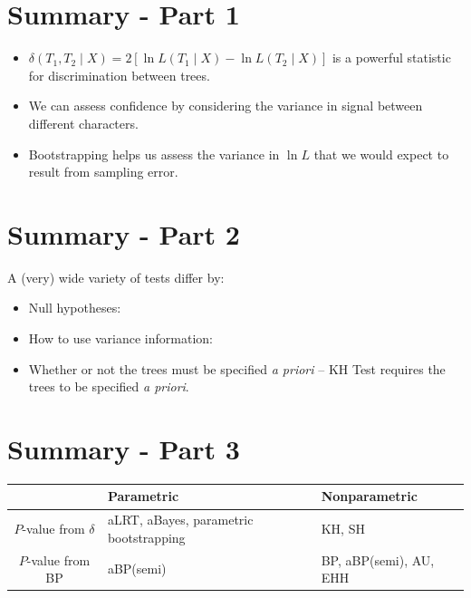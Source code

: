 \documentclass[landscape]{foils}
\begin{document}
\myNewSlide
\section*{Summary - Part 1}

\begin{itemize}
	\item $\delta(T_1,T_2 \mid X) = 2\left[\ln L(T_1 \mid X) - \ln L(T_2 \mid X)\right]$ is a powerful statistic for discrimination between trees.
	\item We can assess confidence by considering the variance in signal between different characters.
	\item Bootstrapping helps us assess the variance in $\ln L$ that we would expect to result from sampling error.
\end{itemize}

\myNewSlide
\section*{Summary - Part 2}
\normalsize
A (very) wide variety of tests differ by:
\begin{itemize}
	\item Null hypotheses:
	\item How to use variance information:
	\item Whether or not the trees must be specified {\em a priori} -- KH Test requires the trees to be specified {\em a priori}.
\end{itemize}

\myNewSlide
\section*{Summary - Part 3}
\large
\begin{table}[htdp]
\begin{center}
\begin{tabular}{|c|p{7cm}|p{6cm}|}
\hline
& Parametric & Nonparametric \\
\hline
$P$-value from $\delta$  & aLRT, aBayes, parametric bootstrapping & KH, SH \\
\hline
$P$-value from BP  &aBP(semi)  & BP, aBP(semi), AU, EHH\\
\hline
\end{tabular}
\end{center}
\label{default}
\end{table}%
\end{document}
